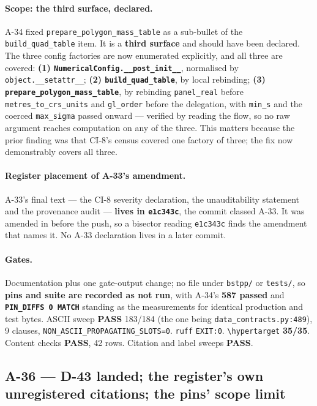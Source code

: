 \documentclass[
  10pt,
]{article}
\begin{document}
\paragraph{Scope: the third surface, declared.}
A-34 fixed \texttt{prepare\_polygon\_mass\_table} as a sub-bullet of the \texttt{build\_quad\_table} item. It is a \textbf{third surface} and should have been declared. The three config factories are now enumerated explicitly, and all three are covered: \textbf{(1) \texttt{NumericalConfig.\_\_post\_init\_\_}}, normalised by \texttt{object.\_\_setattr\_\_}; \textbf{(2) \texttt{build\_quad\_table}}, by local rebinding; \textbf{(3) \texttt{prepare\_polygon\_mass\_table}}, by rebinding \texttt{panel\_real} before \texttt{metres\_to\_crs\_units} and \texttt{gl\_order} before the delegation, with \texttt{min\_s} and the coerced \texttt{max\_sigma} passed onward --- verified by reading the flow, so no raw argument reaches computation on any of the three. This matters because the prior finding was that CI-8's census covered one factory of three; the fix now demonstrably covers all three.

\paragraph{Register placement of A-33's amendment.}
A-33's final text --- the CI-8 severity declaration, the unauditability statement and the provenance audit --- \textbf{lives in \texttt{e1c343c}}, the commit classed A-33. It was amended in before the push, so a bisector reading \texttt{e1c343c} finds the amendment that names it. No A-33 declaration lives in a later commit.

\paragraph{Gates.}
Documentation plus one gate-output change; no file under \texttt{bstpp/} or \texttt{tests/}, so \textbf{pins and suite are recorded as not run}, with A-34's \textbf{587 passed} and \textbf{\texttt{PIN\_DIFFS 0 MATCH}} standing as the measurements for identical production and test bytes. ASCII sweep \textbf{PASS} 183/184 (the one being \texttt{data\_contracts.py:489}), 9 clauses, \texttt{NON\_ASCII\_PROPAGATING\_SLOTS=0}. \texttt{ruff} \texttt{EXIT:0}. \texttt{\textbackslash hypertarget} \textbf{35/35}. Content checks \textbf{PASS}, 42 rows. Citation and label sweeps \textbf{PASS}.

\hypertarget{a-36}{%
\subsection{A-36 --- D-43 landed; the register's own unregistered citations; the pins' scope limit}\label{a-36}}
\end{document}
